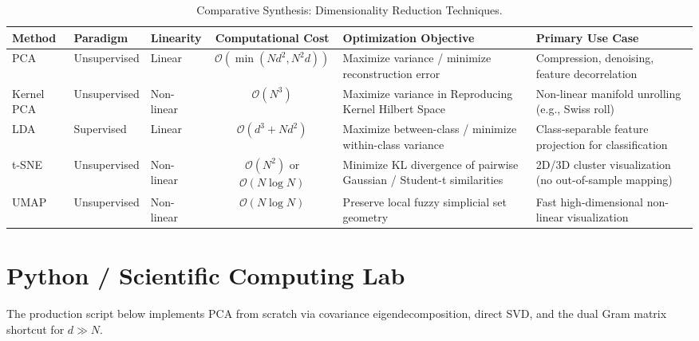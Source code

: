 \begin{table}[htbp]
\centering
\footnotesize
\setlength{\tabcolsep}{3pt}
\begin{tabularx}{\textwidth}{lllc>{\raggedright\arraybackslash}X>{\raggedright\arraybackslash}X}
\toprule
\textbf{Method} & \textbf{Paradigm} & \textbf{Linearity} & \textbf{Computational Cost} & \textbf{Optimization Objective} & \textbf{Primary Use Case} \\
\midrule
PCA & Unsupervised & Linear & $\mathcal{O}(\min(N d^2, N^2 d))$ & Maximize variance / minimize reconstruction error & Compression, denoising, feature decorrelation \\
\addlinespace
Kernel PCA & Unsupervised & Non-linear & $\mathcal{O}(N^3)$ & Maximize variance in Reproducing Kernel Hilbert Space & Non-linear manifold unrolling (e.g., Swiss roll) \\
\addlinespace
LDA & Supervised & Linear & $\mathcal{O}(d^3 + N d^2)$ & Maximize between-class / minimize within-class variance & Class-separable feature projection for classification \\
\addlinespace
t-SNE & Unsupervised & Non-linear & $\mathcal{O}(N^2)$ or $\mathcal{O}(N \log N)$ & Minimize KL divergence of pairwise Gaussian / Student-t similarities & 2D/3D cluster visualization (no out-of-sample mapping) \\
\addlinespace
UMAP & Unsupervised & Non-linear & $\mathcal{O}(N \log N)$ & Preserve local fuzzy simplicial set geometry & Fast high-dimensional non-linear visualization \\
\bottomrule
\end{tabularx}
\caption{Comparative Synthesis: Dimensionality Reduction Techniques.}
\label{tab:dim_reduction_comp}
\end{table}

\section{Python / Scientific Computing Lab}

The production script below implements PCA from scratch via covariance eigendecomposition, direct SVD, and the dual Gram matrix shortcut for $d \gg N$.

